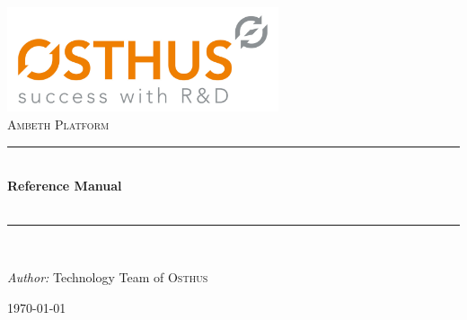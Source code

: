 \ifpdf
\begin{titlepage}

\begin{center}


\includegraphics[width=0.6\textwidth]{img/2014-08-07-MG-Osthus_logo_RGB-high-res.jpg}\\[1cm]

\textsc{\huge Ambeth Platform}\\[1.5cm]

\newcommand{\HRule}{\rule{\linewidth}{0.5mm}}
\HRule \\[0.4cm]
{ \huge \bfseries Reference Manual}\\[0.4cm]
{ \huge \bfseries \version}\\[0.4cm]
\HRule \\[1.5cm]

\begin{minipage}{0.5\textwidth}
\begin{flushleft} \large
\emph{Author:} Technology Team of \textsc{Osthus}\\
\end{flushleft}
\end{minipage}

\vfill

{\large \today}

\end{center}

\end{titlepage}
\fi